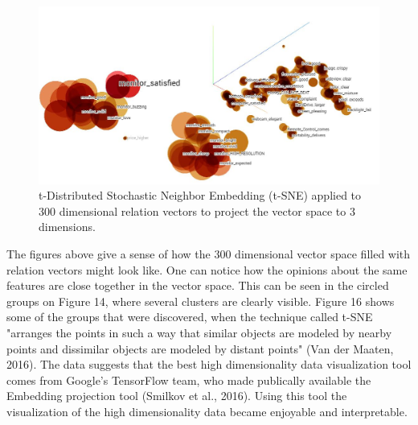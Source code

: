 \documentclass{sig-alternate}
\begin{document}
\begin{figure}
\centering
\includegraphics[scale=0.33]{images/tsne_new.JPG}
\caption{t-Distributed Stochastic Neighbor Embedding (t-SNE) applied to 300 dimensional relation vectors to project the vector space to 3 dimensions.}
\end{figure}

The figures above give a sense of how the 300 dimensional vector space filled with relation vectors might look like. One can notice how the opinions about the same features are close together in the vector space. This can be seen in the circled groups on Figure 14, where several clusters are clearly visible. Figure 16 shows some of the groups that were discovered, when the technique called t-SNE "arranges the points in such a way that similar objects are modeled by nearby points and dissimilar objects are modeled by distant points" (Van der Maaten, 2016). The data suggests that the best high dimensionality data visualization tool comes from Google's TensorFlow team, who made publically available the Embedding projection tool (Smilkov et al., 2016). Using this tool the visualization of the high dimensionality data became enjoyable and interpretable. 
\end{document}
